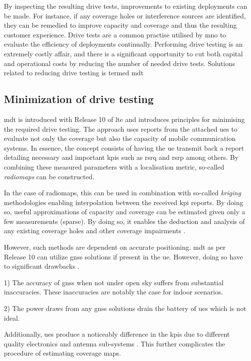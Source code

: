 By inspecting the resulting drive tests, improvements to existing deployments can be made. For instance, if any coverage holes or interference sources are identified, they can be remedied to improve capacity and coverage and thus the resulting customer experience. Drive tests are a common practise utilised by \gls{mno} to evaluate the efficiency of deployments continually. Performing drive testing is an extremely costly affair, and there is a significant opportunity to cut both capital and operational costs by reducing the number of needed drive tests. Solutions related to reducing drive testing is termed \gls{mdt}


\subsection{Minimization of drive testing}
\gls{mdt} is introduced with Release 10 of \gls{lte} and introduces principles for minimising the required drive testing. The approach uses reports from the attached \glspl{ue} to evaluate not only the coverage but also the capacity of mobile communication systems. In essence, the concept consists of having the \gls{ue} transmit back a report detailing necessary and important \glspl{kpi} such as \gls{rsrq} and \gls{rsrp} among others. By combining these measured parameters with a localisation metric, so-called \emph{radiomaps} can be constructed. 

In the case of radiomaps, this can be used in combination with so-called \emph{kriging} methodologies enabling interpolation between the received \gls{kpi} reports. By doing so, useful approximations of capacity and coverage can be estimated given only a few measurements (sparse). By doing so, it enables the deduction and analysis of any existing coverage holes and other coverage impairments \cite{Bi2018EngineeringManagement}. 

However, such methods are dependent on accurate positioning. \gls{mdt} as per Release 10 \cite{3GPP2017} can utilize \gls{gnss} solutions if present in the \gls{ue}. However, doing so have to significant drawbacks \cite{Schloemann2016}. 

1) The accuracy of \gls{gnss} when not under open sky suffers from substantial inaccuracies. These inaccuracies are notably the case for indoor scenarios. 

2) The power draws from any \gls{gnss} solutions drain the battery of \glspl{ue} which is not ideal. 

Additionally, \glspl{ue} produce a noticeably difference in the \glspl{kpi} due to different quality electronics and antenna sub-systems \cite{Karstensen2017}. This further complicates the procedure of estimating coverage maps.

